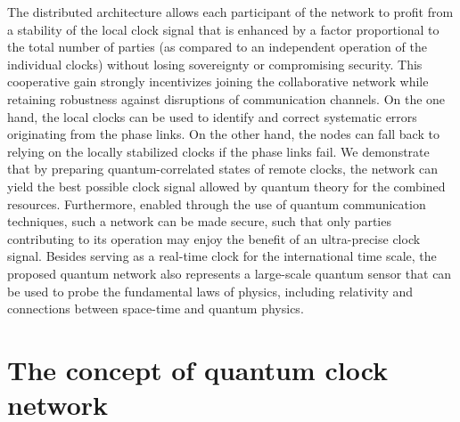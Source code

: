 The distributed architecture allows each participant of the network to profit
from a stability of the local clock signal that is enhanced by a factor
proportional to the total number of parties (as compared to an independent
operation of the individual clocks) without losing sovereignty or compromising
security. This cooperative gain strongly incentivizes joining the collaborative
network while retaining robustness against
 disruptions of communication channels.
On the one hand,
the local clocks can be used to identify and correct systematic errors
originating from the phase links. On the other hand, the nodes can fall
back to relying on the locally stabilized clocks if the phase links fail.
We demonstrate that by preparing quantum-correlated states of
remote clocks, the network can yield the best possible clock signal allowed by
quantum theory for the combined resources.
Furthermore, enabled through the use of quantum communication techniques,  such
a network can be made secure, such that only parties contributing to its
operation may enjoy the benefit of an ultra-precise clock signal. Besides
serving as a real-time clock for the international time scale,  the proposed
quantum network also represents a large-scale quantum sensor that can be used to
probe the fundamental laws of physics, including relativity and connections between space-time and quantum physics.

  










\section{The concept of quantum clock network}
\label{sec:QCN}

